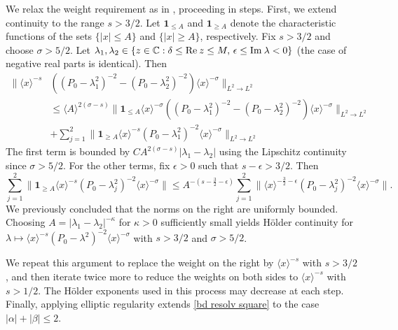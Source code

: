 \documentclass[11pt]{amsart}
\numberwithin{equation}{section}
\def\C{{\mathbb C}}
\def\Re{{\rm Re}\:}
\def\Im{{\rm Im}\:}
\begin{document}
We relax the weight requirement as in \cite[Section 3]{kn:cavo04}, proceeding in steps. First, we extend continuity to the range $s > 3/2$. Let $\mathbf{1}_{\le A}$ and $\mathbf{1}_{\ge A}$ denote the characteristic functions of the sets $\{ |x| \le A\}$ and $\{ |x| \ge A \}$, respectively. Fix $s > 3/2$ and choose $\sigma > 5/2$. Let $\lambda_1, \lambda_2 \in \{z \in \C : \delta \le \Re z \le M, \, \epsilon \le \Im \lambda < 0\}$ (the case of negative real parts is identical). Then
\begin{equation*}
\begin{split}
\| \langle x \rangle^{-s} &((P_0- \lambda_1^2)^{-2} - (P_0 - \lambda^2_2)^{-2}) \langle x \rangle^{-\sigma} \|_{L^2 \to L^2} \\
&\le \langle A \rangle^{2(\sigma-s)} \| \mathbf{1}_{\le A} \langle x \rangle^{-\sigma} ((P_0- \lambda^2_1)^{-2} - (P_0 - \lambda^2_2)^{-2}) \langle x \rangle^{-\sigma} \|_{L^2 \to L^2} \\
&+  \sum_{j = 1}^2 \| \mathbf{1}_{\ge A} \langle x \rangle^{-s} (P_0- \lambda^2_1)^{-2} \langle x \rangle^{-\sigma} \|_{L^2 \to L^2} \end{split}
\end{equation*}
The first term is bounded by $C A^{2(\sigma-s)} |\lambda_1 - \lambda_2|$ using the Lipschitz continuity since $\sigma > 5/2$. For the other terms,  fix $\epsilon > 0$ such that $s - \epsilon > 3/2$. Then
\begin{equation*}
\sum_{j = 1}^2 \| \mathbf{1}_{\ge A} \langle x \rangle^{-s} (P_0- \lambda_j^2)^{-2} \langle x \rangle^{-\sigma} \| \le A^{-(s -\frac{3}{2} - \epsilon)}  \sum_{j = 1}^2 \| \langle x \rangle^{-\frac{3}{2}-\epsilon} (P_0- \lambda_j^2)^{-2} \langle x \rangle^{-\sigma} \|.
\end{equation*}
We previously concluded that the norms on the right are uniformly bounded. Choosing $A = |\lambda_1 - \lambda_2|^{-\kappa}$ for $\kappa > 0$ sufficiently small yields H\"older continuity for $\lambda \mapsto \langle x \rangle^{-s} (P_0 - \lambda^2)^{-2} \langle x \rangle^{-\sigma}$ with $s > 3/2$ and $\sigma > 5/2$.

We repeat this argument to replace the weight on the right by $\langle x \rangle^{-s}$ with $s > 3/2$, and then iterate twice more to reduce the weights on both sides to $\langle x \rangle^{-s}$ with $s > 1/2$. The H\"older exponents used in this process may decrease at each step. Finally, applying elliptic regularity extends \eqref{bd resolv square} to the case $|\alpha| + |\beta| \le 2$.
\end{document}
